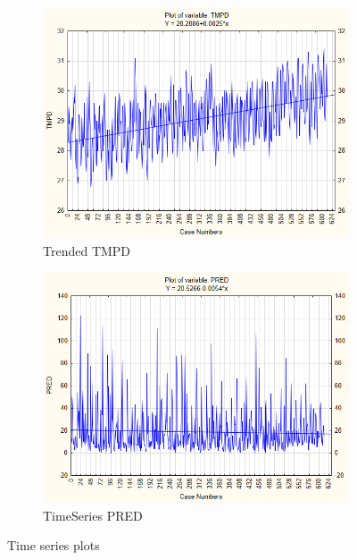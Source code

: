 \documentclass[12pt,a4paper]{article}
\begin{document}
\begin{figure}
	\centering
\begin{subfigure}[b]{0.4\textwidth}
	\centering
	\includegraphics[width=\linewidth]{"../Assignment 2/Trended TMPD"}
	\caption{Trended TMPD}
	\label{fig:trended-tmpd}
\end{subfigure}
\begin{subfigure}[b]{0.4\textwidth}
	\centering
	\includegraphics[width=\linewidth]{"../Assignment 2/TimeSeries PRED"}
	\caption{TimeSeries PRED}
	\label{fig:timeseries-pred}
\end{subfigure}
\caption{Time series plots}\label{fig:trapez3}
\end{figure}
\newpage
\end{document}
